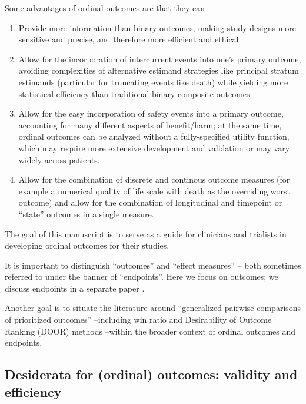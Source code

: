 \documentclass[
  11pt,
  fleqn
]{article}
\begin{document}
Some advantages of ordinal outcomes are that they can
\begin{enumerate}
  \item Provide more information than binary outcomes, making study
    designs more sensitive and precise, and
    therefore more efficient and ethical

  \item Allow for the incorporation of intercurrent events into one's primary
    outcome, avoiding complexities of alternative estimand strategies like
    principal stratum estimands (particular for truncating events
    like death) while
    yielding more statistical efficiency than traditional binary
    composite outcomes

  \item Allow for the easy incorporation of safety events into a
    primary outcome, accounting for many different aspects
    of benefit/harm; at the same time, ordinal outcomes can be
    analyzed without a
    fully-specified utility function, which may require more
    extensive development and validation or may vary widely across patients.

  \item Allow for the combination of discrete and continous outcome
    measures (for
      example a numerical quality of life scale with death as the
      overriding worst
    outcome) and allow for the combination of longitudinal and timepoint or
    ``state'' outcomes in a single measure.

\end{enumerate}

The goal of this manuscript is to serve as a guide for clinicians and trialists
in developing ordinal outcomes for their studies.

It is important to distinguish ``outcomes'' and ``effect measures'' -- both
sometimes referred to under the banner of ``endpoints''. Here we
focus on outcomes; we discuss endpoints in a separate paper .

Another goal is to situate the literature around ``generalized
pairwise comparisons of prioritized outcomes''
\citep{buyseGeneralizedPairwiseComparisons2022}--including win ratio
\citep{pocockWinRatioNew2012} and Desirability of Outcome Ranking (DOOR)
methods \citep{evansDesirabilityOutcomeRanking2015,
ongUnlockingDOORHow2023}--within the broader context of ordinal outcomes and
endpoints.

\subsection{Desiderata for (ordinal) outcomes: validity and efficiency}
\end{document}
